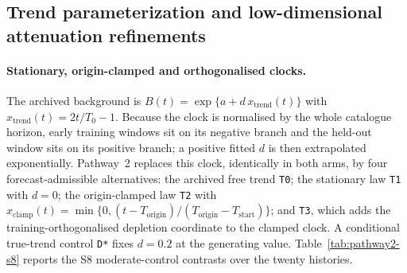 \subsection{Trend parameterization and low-dimensional attenuation refinements}\label{sec:pathway2-3-refinements}

\paragraph{Stationary, origin-clamped and orthogonalised clocks.}
The archived background is $B(t)=\exp\{a+d\,x_{\mathrm{trend}}(t)\}$ with $x_{\mathrm{trend}}(t)=2t/T_0-1$. Because the clock is normalised by the whole catalogue horizon, early training windows sit on its negative branch and the held-out window sits on its positive branch; a positive fitted $d$ is then extrapolated exponentially. Pathway~2 replaces this clock, identically in both arms, by four forecast-admissible alternatives: the archived free trend \texttt{T0}; the stationary law \texttt{T1} with $d=0$; the origin-clamped law \texttt{T2} with $x_{\mathrm{clamp}}(t)=\min\{0,(t-T_{\mathrm{origin}})/(T_{\mathrm{origin}}-T_{\mathrm{start}})\}$; and \texttt{T3}, which adds the training-orthogonalised depletion coordinate to the clamped clock. A conditional true-trend control \texttt{D*} fixes $d=0.2$ at the generating value. Table~\ref{tab:pathway2-s8} reports the S8 moderate-control contrasts over the twenty histories.

\begin{table}[htbp]\centering\scriptsize
{}
\caption{S8 moderate control under the archived and forecast-admissible clocks, $20$ histories. Overfitting loss is the uninhibited comparator's held-out excess over its true-nuisance state; estimation loss compares the fitted inhibited state with the generating truth; held-out gain is the paired inhibited-minus-uninhibited contrast. Positive overfitting loss is a loss. Entries are nats; $\hat\eta$ RMSE is against $\eta_\star=0.4$.}
\label{tab:pathway2-s8}
\end{table}


